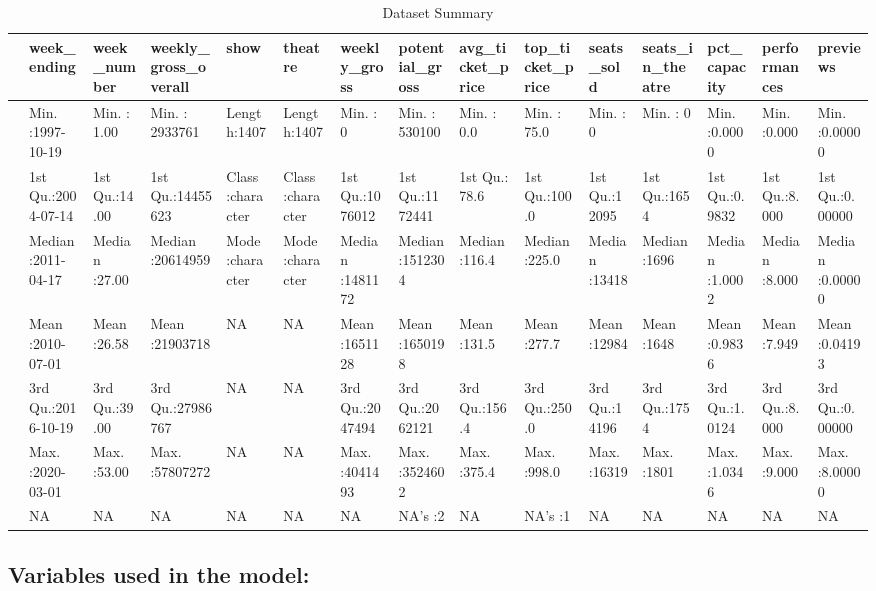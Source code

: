 \documentclass[
]{article}
\begin{document}
\begin{table}

\caption{\label{tab:unnamed-chunk-1}Dataset Summary}
\centering
\begin{tabular}[t]{l|l|l|l|l|l|l|l|l|l|l|l|l|l|l}
\hline
  &  week\_ending &  week\_number & weekly\_gross\_overall &     show &   theatre &  weekly\_gross & potential\_gross & avg\_ticket\_price & top\_ticket\_price &   seats\_sold & seats\_in\_theatre &  pct\_capacity &  performances &    previews\\
\hline
 & Min.   :1997-10-19 & Min.   : 1.00 & Min.   : 2933761 & Length:1407 & Length:1407 & Min.   :      0 & Min.   : 530100 & Min.   :  0.0 & Min.   : 75.0 & Min.   :    0 & Min.   :   0 & Min.   :0.0000 & Min.   :0.000 & Min.   :0.00000\\
\hline
 & 1st Qu.:2004-07-14 & 1st Qu.:14.00 & 1st Qu.:14455623 & Class :character & Class :character & 1st Qu.:1076012 & 1st Qu.:1172441 & 1st Qu.: 78.6 & 1st Qu.:100.0 & 1st Qu.:12095 & 1st Qu.:1654 & 1st Qu.:0.9832 & 1st Qu.:8.000 & 1st Qu.:0.00000\\
\hline
 & Median :2011-04-17 & Median :27.00 & Median :20614959 & Mode  :character & Mode  :character & Median :1481172 & Median :1512304 & Median :116.4 & Median :225.0 & Median :13418 & Median :1696 & Median :1.0002 & Median :8.000 & Median :0.00000\\
\hline
 & Mean   :2010-07-01 & Mean   :26.58 & Mean   :21903718 & NA & NA & Mean   :1651128 & Mean   :1650198 & Mean   :131.5 & Mean   :277.7 & Mean   :12984 & Mean   :1648 & Mean   :0.9836 & Mean   :7.949 & Mean   :0.04193\\
\hline
 & 3rd Qu.:2016-10-19 & 3rd Qu.:39.00 & 3rd Qu.:27986767 & NA & NA & 3rd Qu.:2047494 & 3rd Qu.:2062121 & 3rd Qu.:156.4 & 3rd Qu.:250.0 & 3rd Qu.:14196 & 3rd Qu.:1754 & 3rd Qu.:1.0124 & 3rd Qu.:8.000 & 3rd Qu.:0.00000\\
\hline
 & Max.   :2020-03-01 & Max.   :53.00 & Max.   :57807272 & NA & NA & Max.   :4041493 & Max.   :3524602 & Max.   :375.4 & Max.   :998.0 & Max.   :16319 & Max.   :1801 & Max.   :1.0346 & Max.   :9.000 & Max.   :8.00000\\
\hline
 & NA & NA & NA & NA & NA & NA & NA's   :2 & NA & NA's   :1 & NA & NA & NA & NA & NA\\
\hline
\end{tabular}
\end{table}

\hypertarget{variables-used-in-the-model}{%
\subsection{Variables used in the model:}\label{variables-used-in-the-model}}
\end{document}

